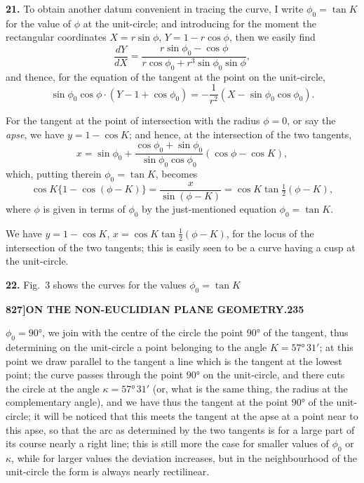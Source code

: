 \documentclass[11pt,a4paper]{book}
\begin{document}
\noindent\textbf{21.} To obtain another datum convenient in tracing the curve, I write $\phi_0 = \tan K$ for the value of $\phi$ at the unit-circle; and introducing for the moment the rectangular coordinates $X = r\sin\phi$, $Y = 1 - r\cos\phi$, then we easily find
\[
\frac{dY}{dX} = \frac{r\sin\phi_0 - \cos\phi}{r\cos\phi_0 + r^3\sin\phi_0\sin\phi},
\]
and thence, for the equation of the tangent at the point on the unit-circle,
\[
\sin\phi_0\cos\phi \cdot (Y - 1 + \cos\phi_0) = -\frac{1}{r^2}(X - \sin\phi_0\cos\phi_0).
\]

For the tangent at the point of intersection with the radius $\phi = 0$, or say the \textit{apse}, we have $y = 1 - \cos K$; and hence, at the intersection of the two tangents,
\[
x = \sin\phi_0 + \frac{\cos\phi_0 + \sin\phi_0}{\sin\phi_0\cos\phi_0}(\cos\phi - \cos K),
\]
which, putting therein $\phi_0 = \tan K$, becomes
\[
\cos K\{1 - \cos(\phi - K)\} = \frac{x}{\sin(\phi - K)} = \cos K\tan\tfrac{1}{2}(\phi - K),
\]
where $\phi$ is given in terms of $\phi_0$ by the just-mentioned equation $\phi_0 = \tan K$.

We have $y = 1 - \cos K$, $x = \cos K\tan\tfrac{1}{2}(\phi - K)$, for the locus of the intersection of the two tangents; this is easily seen to be a curve having a cusp at the unit-circle.

\noindent\textbf{22.} Fig.~3 shows the curves for the values $\phi_0 = \tan K$

\begin{figure}[H]
\centering
{}
\end{figure}

\newpage
\setcounter{page}{235}

\noindent\textbf{827]}\hfill\textbf{ON THE NON-EUCLIDIAN PLANE GEOMETRY.}\hfill\textbf{235}

\bigskip

\noindent $\phi_0 = 90°$, we join with the centre of the circle the point $90°$ of the tangent, thus determining on the unit-circle a point belonging to the angle $K = 57°\,31'$; at this point we draw parallel to the tangent a line which is the tangent at the lowest point; the curve passes through the point $90°$ on the unit-circle, and there cuts the circle at the angle $\kappa = 57°\,31'$ (or, what is the same thing, the radius at the complementary angle), and we have thus the tangent at the point $90°$ of the unit-circle; it will be noticed that this meets the tangent at the apse at a point near to this apse, so that the arc as determined by the two tangents is for a large part of its course nearly a right line; this is still more the case for smaller values of $\phi_0$ or $\kappa$, while for larger values the deviation increases, but in the neighbourhood of the unit-circle the form is always nearly rectilinear.
\end{document}

